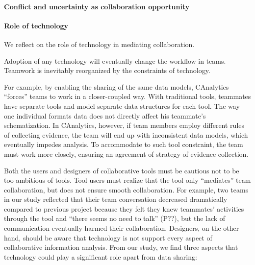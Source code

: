 
\paragraph{Conflict and uncertainty  as collaboration opportunity }

\paragraph{Role of technology}
We reflect on the role of technology in mediating collaboration. 

Adoption of any technology will eventually change the workflow in teams. Teamwork is inevitably reorganized by the constraints of technology.

For example, by enabling the sharing of the same data models, CAnalytics ``forces'' teams to work in a closer-coupled way. With traditional tools, teammates have separate tools and model separate data structures for each tool. The way one individual formats data does not directly affect his teammate's schematization. In CAnalytics, however, if team members employ different rules of collecting evidence, the team will end up with inconsistent data models, which eventually impedes analysis. To accommodate to such tool constraint, the team must work more closely, ensuring an agreement of strategy of evidence collection.

Both the users and designers of collaborative tools must be cautious not to be too ambitious of tools. Tool users must realize that the tool only ``mediates'' team collaboration, but does not ensure smooth collaboration. For example, two teams in our study reflected that their team conversation decreased dramatically compared to previous project because they felt they knew teammates' activities through the tool and ``there seems no need to talk'' (P??), but the lack of communication eventually harmed their collaboration. Designers, on the other hand, should be aware that technology is not support every aspect of collaborative information analysis. From our study, we find three aspects that technology could play a significant role apart from data sharing:

